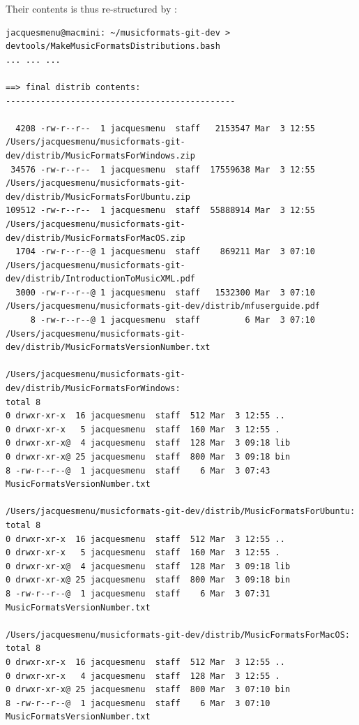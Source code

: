 Their contents is thus re-structured by :
\begin{lstlisting}[language=Terminal]
jacquesmenu@macmini: ~/musicformats-git-dev > devtools/MakeMusicFormatsDistributions.bash
... ... ...

==> final distrib contents:
----------------------------------------------

  4208 -rw-r--r--  1 jacquesmenu  staff   2153547 Mar  3 12:55 /Users/jacquesmenu/musicformats-git-dev/distrib/MusicFormatsForWindows.zip
 34576 -rw-r--r--  1 jacquesmenu  staff  17559638 Mar  3 12:55 /Users/jacquesmenu/musicformats-git-dev/distrib/MusicFormatsForUbuntu.zip
109512 -rw-r--r--  1 jacquesmenu  staff  55888914 Mar  3 12:55 /Users/jacquesmenu/musicformats-git-dev/distrib/MusicFormatsForMacOS.zip
  1704 -rw-r--r--@ 1 jacquesmenu  staff    869211 Mar  3 07:10 /Users/jacquesmenu/musicformats-git-dev/distrib/IntroductionToMusicXML.pdf
  3000 -rw-r--r--@ 1 jacquesmenu  staff   1532300 Mar  3 07:10 /Users/jacquesmenu/musicformats-git-dev/distrib/mfuserguide.pdf
     8 -rw-r--r--@ 1 jacquesmenu  staff         6 Mar  3 07:10 /Users/jacquesmenu/musicformats-git-dev/distrib/MusicFormatsVersionNumber.txt

/Users/jacquesmenu/musicformats-git-dev/distrib/MusicFormatsForWindows:
total 8
0 drwxr-xr-x  16 jacquesmenu  staff  512 Mar  3 12:55 ..
0 drwxr-xr-x   5 jacquesmenu  staff  160 Mar  3 12:55 .
0 drwxr-xr-x@  4 jacquesmenu  staff  128 Mar  3 09:18 lib
0 drwxr-xr-x@ 25 jacquesmenu  staff  800 Mar  3 09:18 bin
8 -rw-r--r--@  1 jacquesmenu  staff    6 Mar  3 07:43 MusicFormatsVersionNumber.txt

/Users/jacquesmenu/musicformats-git-dev/distrib/MusicFormatsForUbuntu:
total 8
0 drwxr-xr-x  16 jacquesmenu  staff  512 Mar  3 12:55 ..
0 drwxr-xr-x   5 jacquesmenu  staff  160 Mar  3 12:55 .
0 drwxr-xr-x@  4 jacquesmenu  staff  128 Mar  3 09:18 lib
0 drwxr-xr-x@ 25 jacquesmenu  staff  800 Mar  3 09:18 bin
8 -rw-r--r--@  1 jacquesmenu  staff    6 Mar  3 07:31 MusicFormatsVersionNumber.txt

/Users/jacquesmenu/musicformats-git-dev/distrib/MusicFormatsForMacOS:
total 8
0 drwxr-xr-x  16 jacquesmenu  staff  512 Mar  3 12:55 ..
0 drwxr-xr-x   4 jacquesmenu  staff  128 Mar  3 12:55 .
0 drwxr-xr-x@ 25 jacquesmenu  staff  800 Mar  3 07:10 bin
8 -rw-r--r--@  1 jacquesmenu  staff    6 Mar  3 07:10 MusicFormatsVersionNumber.txt
\end{lstlisting}

